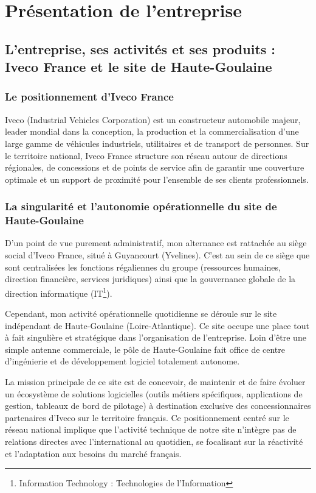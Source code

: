 \section{Présentation de l'entreprise}

\subsection{L'entreprise, ses activités et ses produits : Iveco France et le site de Haute-Goulaine}

\subsubsection{Le positionnement d'Iveco France}

Iveco (Industrial Vehicles Corporation) est un constructeur automobile majeur, leader mondial dans la conception, la production et la commercialisation d'une large gamme de véhicules industriels, utilitaires et de transport de personnes. Sur le territoire national, Iveco France structure son réseau autour de directions régionales, de concessions et de points de service afin de garantir une couverture optimale et un support de proximité pour l'ensemble de ses clients professionnels.

\subsubsection{La singularité et l'autonomie opérationnelle du site de Haute-Goulaine}

D'un point de vue purement administratif, mon alternance est rattachée au siège social d'Iveco France, situé à Guyancourt (Yvelines). C'est au sein de ce siège que sont centralisées les fonctions régaliennes du groupe (ressources humaines, direction financière, services juridiques) ainsi que la gouvernance globale de la direction informatique (IT\footnote{Information Technology : Technologies de l'Information}).

Cependant, mon activité opérationnelle quotidienne se déroule sur le site indépendant de Haute-Goulaine (Loire-Atlantique). Ce site occupe une place tout à fait singulière et stratégique dans l'organisation de l'entreprise. Loin d'être une simple antenne commerciale, le pôle de Haute-Goulaine fait office de centre d'ingénierie et de développement logiciel totalement autonome.

La mission principale de ce site est de concevoir, de maintenir et de faire évoluer un écosystème de solutions logicielles (outils métiers spécifiques, applications de gestion, tableaux de bord de pilotage) à destination exclusive des concessionnaires partenaires d'Iveco sur le territoire français. Ce positionnement centré sur le réseau national implique que l'activité technique de notre site n'intègre pas de relations directes avec l'international au quotidien, se focalisant sur la réactivité et l'adaptation aux besoins du marché français.


